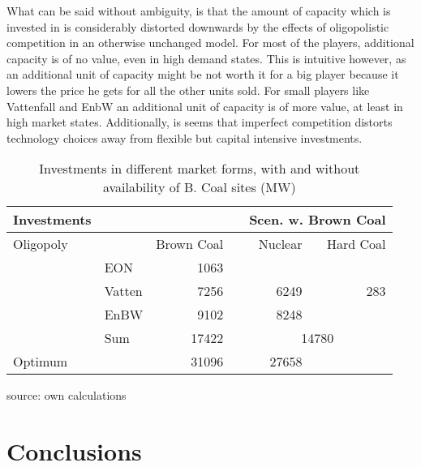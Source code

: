 What can be said without ambiguity, is that the amount of capacity which is invested in is considerably distorted downwards by the effects of oligopolistic competition in an otherwise unchanged model. For most of the players, additional capacity is of no value, even in high demand states. This is intuitive however, as an additional unit of capacity might be not worth it for a big player because it lowers the price he gets for all the other units sold. For small players like Vattenfall and EnbW an additional unit of capacity is of more value, at least in high market states. Additionally, is seems that imperfect competition distorts technology choices away from flexible but capital intensive investments.

\begin{table}
\centering
\caption{Investments in different market forms, with and without availability of B. Coal sites (MW)}
\begin{tabular}{llrrrr}
\hline
\hline
Investments &            &            &            & \multicolumn{ 2}{r}{Scen. w. Brown Coal} \\
\hline
 Oligopoly &            & Brown Coal &            &    Nuclear &  Hard Coal \\
\hline
           &        EON &       1063 &            &            &            \\
           &     Vatten &       7256 &            &       6249 &        283 \\
           &       EnBW &       9102 &            &       8248 &            \\
           &        Sum &      17422 &            & \multicolumn{ 2}{c}{14780} \\
\hline
   Optimum &            &      31096 &            &      27658 &            \\
\hline
\hline
\end{tabular}  

\label{tab:invest}
\begin{center}
source: own calculations
\end{center}
\end{table}

\section{Conclusions}

